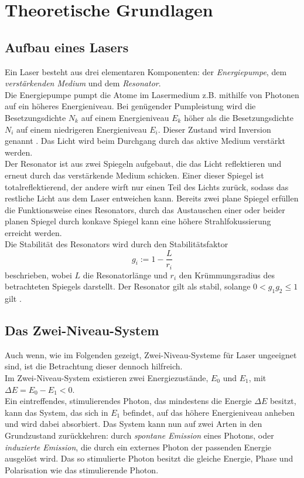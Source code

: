 \section{Theoretische Grundlagen}
\label{sec:theorie}

\subsection{Aufbau eines Lasers}

Ein Laser besteht aus drei elementaren Komponenten: der \textit{Energiepumpe}, dem \textit{verstärkenden Medium} und dem \textit{Resonator}. \\
Die Energiepumpe pumpt die Atome im Lasermedium z.B. mithilfe von Photonen auf ein höheres Energieniveau. 
Bei genügender Pumpleistung wird die Besetzungsdichte $N_k$ auf einem Energieniveau $E_k$ höher als die Besetzungsdichte $N_i$ auf einem niedrigeren Energieniveau $E_i$.
Dieser Zustand wird Inversion genannt \cite{dem01}.
Das Licht wird beim Durchgang durch das aktive Medium verstärkt werden. \\

Der Resonator ist aus zwei Spiegeln aufgebaut, die das Licht reflektieren und erneut durch das verstärkende Medium schicken.
Einer dieser Spiegel ist totalreflektierend, der andere wirft nur einen Teil des Lichts zurück, sodass das restliche Licht aus dem Laser entweichen kann.
Bereits zwei plane Spiegel erfüllen die Funktionsweise eines Resonators, durch das Austauschen einer oder beider planen Spiegel durch konkave Spiegel kann eine höhere Strahlfokussierung erreicht werden. \\

Die Stabilität des Resonators wird durch den Stabilitätsfaktor
\begin{equation}
    g_i := 1 - \frac{L}{r_i} 
\end{equation}
beschrieben, wobei $L$ die Resonatorlänge und $r_i$ den Krümmungsradius des betrachteten Spiegels darstellt.
Der Resonator gilt als stabil, solange $0 < g_1 g_2 \leq 1$ gilt \cite{dem01}.

\subsection{Das Zwei-Niveau-System}
\label{subsec:2nivsys}

Auch wenn, wie im Folgenden gezeigt, Zwei-Niveau-Systeme für Laser ungeeignet sind, ist die Betrachtung dieser dennoch hilfreich. \\
Im Zwei-Niveau-System existieren zwei Energiezustände, $E_0$ und $E_1$, mit $\Delta E = E_0 - E_1 < 0$. \\
Ein eintreffendes, stimulierendes Photon, das mindestens die Energie $\Delta E$ besitzt, kann das System, das sich in $E_1$ befindet, auf das höhere Energieniveau anheben und wird dabei absorbiert.
Das System kann nun auf zwei Arten in den Grundzustand zurückkehren: durch \textit{spontane Emission} eines Photons, oder \textit{induzierte Emission}, die durch ein externes Photon der passenden Energie ausgelöst wird.
Das so stimulierte Photon besitzt die gleiche Energie, Phase und Polarisation wie das stimulierende Photon. \\

